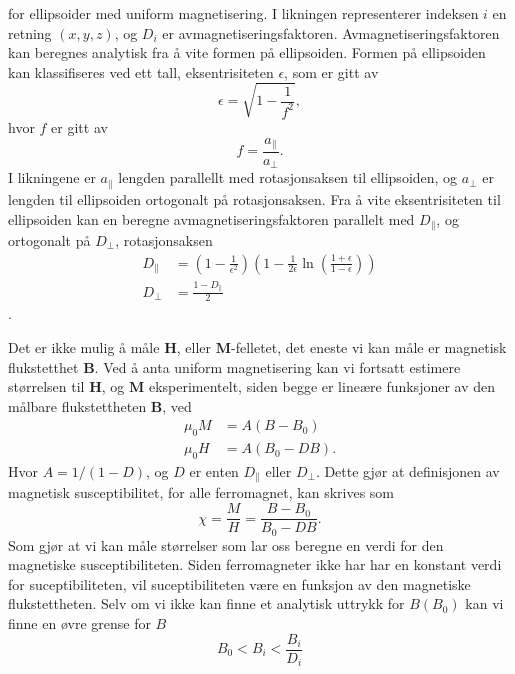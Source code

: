 \documentclass[%
 reprint,
 amsmath,amssymb,
 aps,
]{revtex4-1}
\begin{document}
for ellipsoider med uniform magnetisering. I likningen representerer indeksen $i$ en retning $(x, y, z)$, og $D_i$ er avmagnetiseringsfaktoren. Avmagnetiseringsfaktoren kan beregnes analytisk fra å vite formen på ellipsoiden. Formen på ellipsoiden kan klassifiseres ved ett tall, eksentrisiteten $\epsilon$, som er gitt av
\begin{equation}
  \epsilon = \sqrt{1-\frac{1}{f^2}},\label{eksent}
\end{equation}
hvor $f$ er gitt av
\begin{equation}
  f = \frac{a_{\parallel}}{a_{\perp}}.
\end{equation}
I likningene er $a_{\parallel}$ lengden parallellt med rotasjonsaksen til ellipsoiden, og $a_{\perp}$ er lengden til ellipsoiden ortogonalt på rotasjonsaksen. Fra å vite eksentrisiteten til ellipsoiden kan en beregne avmagnetiseringsfaktoren parallelt med $D_{\parallel}$, og ortogonalt på $D_{\perp}$, rotasjonsaksen
\begin{align}
  D_{\parallel} &= \left(1-\frac{1}{\epsilon^2}\right)\left(1-\frac{1}{2\epsilon}\ln{\left(\frac{1+\epsilon}{1-\epsilon}\right)} \right) \\
  D_{\perp} &= \frac{1-D_{\parallel}}{2}
\end{align}.
\par
Det er ikke mulig å måle $\bm{H}$, eller $\bm{M}$-felletet, det eneste vi kan måle er magnetisk flukstetthet $\bm{B}$. Ved å anta uniform magnetisering kan vi fortsatt estimere størrelsen til $\bm{H}$, og $\bm{M}$ eksperimentelt, siden begge er lineære funksjoner av den målbare flukstettheten $\bm{B}$, ved
\begin{align}
  \mu_0 M &= A\left(B-B_0\right) \\
  \mu_0 H &= A\left(B_0 - DB\right).
\end{align}
Hvor $A=1/(1-D)$, og $D$ er enten $D_{\parallel}$ eller $D_{\perp}$. Dette gjør at definisjonen av magnetisk susceptibilitet, for alle ferromagnet, kan skrives som
\begin{equation}
  \chi = \frac{M}{H} = \frac{B-B_0}{B_0-DB}.
\end{equation}
Som gjør at vi kan måle størrelser som lar oss beregne en verdi for den magnetiske susceptibiliteten. Siden ferromagneter ikke har har en konstant verdi for suceptibiliteten, vil suceptibiliteten være en funksjon av den magnetiske flukstettheten. Selv om vi ikke kan finne et analytisk uttrykk for $B(B_0)$ kan vi finne en øvre grense for $B$
\begin{equation}
  B_0 < B_i < \frac{B_i}{D_i}
\end{equation}
\end{document}

